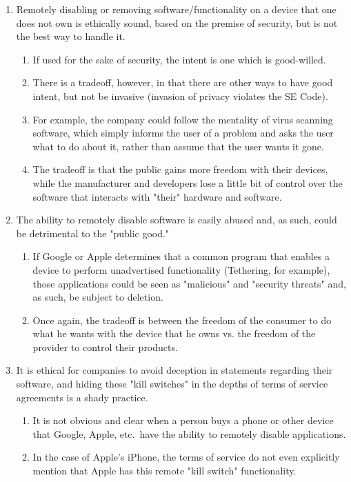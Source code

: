 \documentclass[12pt]{article}
\begin{document}
\begin{enumerate}
\item Remotely disabling or removing software/functionality on a device that one does not own is ethically sound, based on the premise of security, but is not the best way to handle it.
\begin{enumerate}
\item If used for the sake of security, the intent is one which is good-willed.
\item There is a tradeoff, however, in that there are other ways to have good intent, but not be invasive (invasion of privacy violates the SE Code). \cite{secode}
\item For example, the company could follow the mentality of virus scanning software, which simply informs the user of a problem and asks the user what to do about it, rather than assume that the user wants it gone.
\item The tradeoff is that the public gains more freedom with their devices, while the manufacturer and developers lose a little bit of control over the software that interacts with "their" hardware and software.
\end{enumerate}
\item The ability to remotely disable software is easily abused and, as such, could be detrimental to the "public good."
\begin{enumerate}
\item If Google or Apple determines that a common program that enables a device to perform unadvertised functionality (Tethering, for example), those applications could be seen as "malicious" and "security threats" and, as such, be subject to deletion.
\item Once again, the tradeoff is between the freedom of the consumer to do what he wants with the device that he owns vs. the freedom of the provider to control their products.
\end{enumerate}
\item It is ethical for companies to avoid deception in statements regarding their software, and hiding these "kill switches" in the depths of terms of service agreements is a shady practice. \cite{secode}
\begin{enumerate}
\item It is not obvious and clear when a person buys a phone or other device that Google, Apple, etc.\ have the ability to remotely disable applications.
\item In the case of Apple's iPhone, the terms of service do not even explicitly mention that Apple has this remote "kill switch" functionality. \cite{appleTOS}

\end{enumerate}
\end{enumerate}
\end{document}

